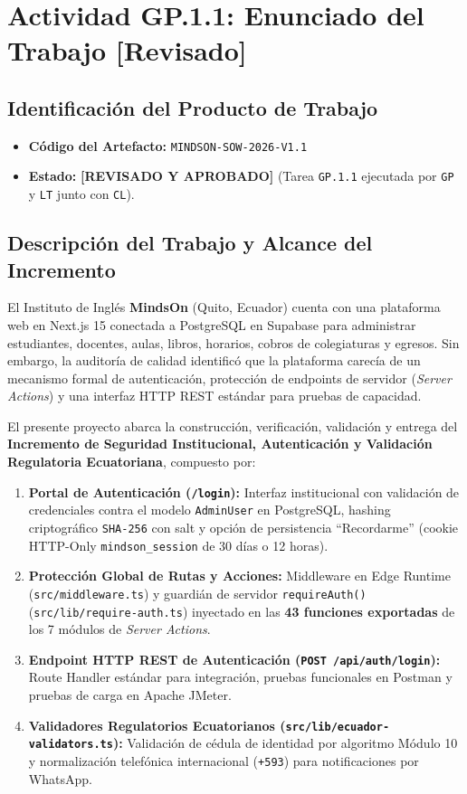 \documentclass[11pt,a4paper]{article}
\begin{document}
\section{Actividad GP.1.1: Enunciado del Trabajo [Revisado]}

\subsection{Identificación del Producto de Trabajo}
\begin{itemize}[noitemsep]
  \item \textbf{Código del Artefacto:} \texttt{MINDSON-SOW-2026-V1.1}
  \item \textbf{Estado:} \textcolor{okGreen}{\textbf{[REVISADO Y APROBADO]}} (Tarea \texttt{GP.1.1} ejecutada por \texttt{GP} y \texttt{LT} junto con \texttt{CL}).
\end{itemize}

\subsection{Descripción del Trabajo y Alcance del Incremento}
El Instituto de Inglés \textbf{MindsOn} (Quito, Ecuador) cuenta con una plataforma web en Next.js 15 conectada a PostgreSQL en Supabase para administrar estudiantes, docentes, aulas, libros, horarios, cobros de colegiaturas y egresos. Sin embargo, la auditoría de calidad identificó que la plataforma carecía de un mecanismo formal de autenticación, protección de endpoints de servidor (\textit{Server Actions}) y una interfaz HTTP REST estándar para pruebas de capacidad.

El presente proyecto abarca la construcción, verificación, validación y entrega del \textbf{Incremento de Seguridad Institucional, Autenticación y Validación Regulatoria Ecuatoriana}, compuesto por:
\begin{enumerate}[noitemsep]
  \item \textbf{Portal de Autenticación (\texttt{/login}):} Interfaz institucional con validación de credenciales contra el modelo \texttt{AdminUser} en PostgreSQL, hashing criptográfico \texttt{SHA-256} con salt y opción de persistencia ``Recordarme'' (cookie HTTP-Only \texttt{mindson\_session} de 30 días o 12 horas).
  \item \textbf{Protección Global de Rutas y Acciones:} Middleware en Edge Runtime (\texttt{src/middleware.ts}) y guardián de servidor \texttt{requireAuth()} (\texttt{src/lib/require-auth.ts}) inyectado en las \textbf{43 funciones exportadas} de los 7 módulos de \textit{Server Actions}.
  \item \textbf{Endpoint HTTP REST de Autenticación (\texttt{POST /api/auth/login}):} Route Handler estándar para integración, pruebas funcionales en Postman y pruebas de carga en Apache JMeter.
  \item \textbf{Validadores Regulatorios Ecuatorianos (\texttt{src/lib/ecuador-validators.ts}):} Validación de cédula de identidad por algoritmo Módulo 10 y normalización telefónica internacional (\texttt{+593}) para notificaciones por WhatsApp.
\end{enumerate}
\end{document}

